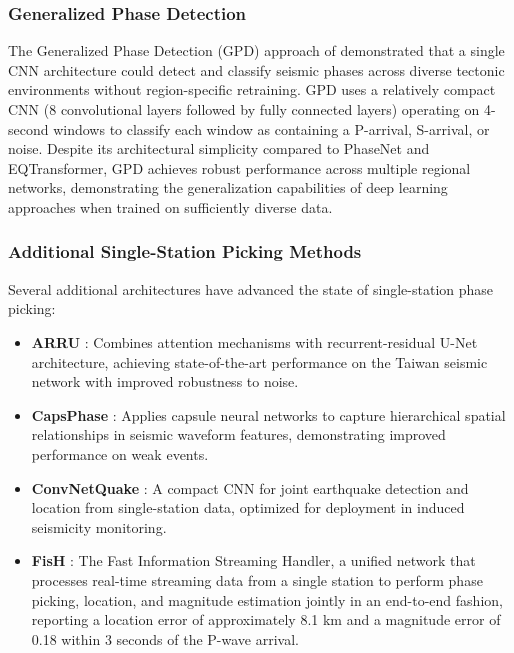\documentclass[review,authoryear]{elsarticle}
\begin{document}
\subsubsection{Generalized Phase Detection}

The Generalized Phase Detection (GPD) approach of \citet{ross2018generalized} demonstrated that a single CNN architecture could detect and classify seismic phases across diverse tectonic environments without region-specific retraining. GPD uses a relatively compact CNN (8 convolutional layers followed by fully connected layers) operating on 4-second windows to classify each window as containing a P-arrival, S-arrival, or noise. Despite its architectural simplicity compared to PhaseNet and EQTransformer, GPD achieves robust performance across multiple regional networks, demonstrating the generalization capabilities of deep learning approaches when trained on sufficiently diverse data.

\subsubsection{Additional Single-Station Picking Methods}

Several additional architectures have advanced the state of single-station phase picking:

\begin{itemize}
\item \textbf{ARRU} \citep{liao2021arru}: Combines attention mechanisms with recurrent-residual U-Net architecture, achieving state-of-the-art performance on the Taiwan seismic network with improved robustness to noise.
\item \textbf{CapsPhase} \citep{saad2020earthquake}: Applies capsule neural networks to capture hierarchical spatial relationships in seismic waveform features, demonstrating improved performance on weak events.
\item \textbf{ConvNetQuake} \citep{perol2018convolutional}: A compact CNN for joint earthquake detection and location from single-station data, optimized for deployment in induced seismicity monitoring.
\item \textbf{FisH} \citep{zhang2024fish}: The Fast Information Streaming Handler, a unified network that processes real-time streaming data from a single station to perform phase picking, location, and magnitude estimation jointly in an end-to-end fashion, reporting a location error of approximately 8.1 km and a magnitude error of 0.18 within 3 seconds of the P-wave arrival.
\end{itemize}
\end{document}
